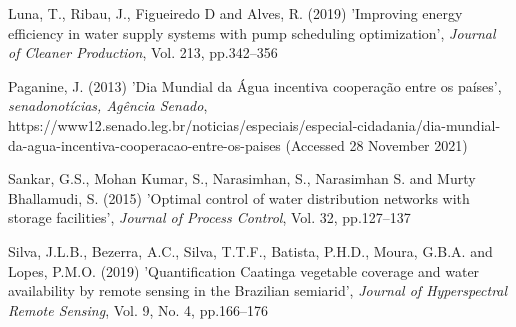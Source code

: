 \documentclass{singlecol}
\theoremstyle{TH}{
\newtheorem{lemma}{Lemma}
\newtheorem{theorem}[lemma]{Theorem}
\newtheorem{corrolary}[lemma]{Corrolary}
\newtheorem{conjecture}[lemma]{Conjecture}
\newtheorem{proposition}[lemma]{Proposition}
\newtheorem{claim}[lemma]{Claim}
\newtheorem{stheorem}[lemma]{Wrong Theorem}
\newtheorem{algorithm}{Algorithm}
}
\theoremstyle{THrm}{
\newtheorem{definition}{Definition}[section]
\newtheorem{question}{Question}[section]
\newtheorem{remark}{Remark}
\newtheorem{scheme}{Scheme}
}
\theoremstyle{THhit}{
\newtheorem{case}{Case}[section]
}
\begin{document}
\begin{thebibliography}{10}
Luna, T., Ribau, J., Figueiredo D and Alves, R. (2019) 'Improving energy efficiency in water supply systems with pump scheduling optimization', {\it Journal of Cleaner Production}, Vol. 213, pp.342--356

Paganine, J. (2013) 'Dia Mundial da Água incentiva cooperação entre os países', {\it senadonotícias, Agência Senado}, https://www12.senado.leg.br/noticias/especiais/especial-cidadania/dia-mundial-da-agua-incentiva-cooperacao-entre-os-paises (Accessed 28 November 2021)

Sankar, G.S., {Mohan Kumar}, S., Narasimhan, S., Narasimhan S. and {Murty Bhallamudi}, S. (2015) 'Optimal control of water distribution networks with storage facilities', {\it Journal of Process Control}, Vol. 32, pp.127--137

Silva, J.L.B., Bezerra, A.C., Silva, T.T.F., Batista, P.H.D., Moura, G.B.A. and  Lopes, P.M.O. (2019) 'Quantification Caatinga vegetable coverage and water availability by remote sensing in the Brazilian semiarid', {\it Journal of Hyperspectral Remote Sensing}, Vol. 9, No. 4, pp.166--176

\end{thebibliography}
\end{document}
